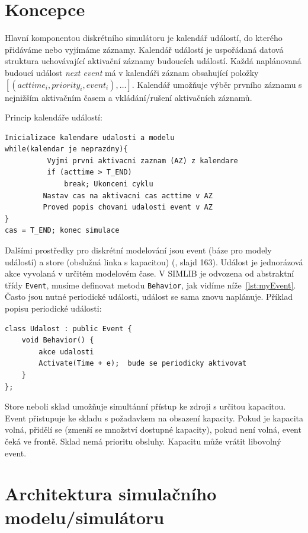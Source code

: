 \documentclass[12pt,a4paper,titlepage,final]{article}
\begin{document}
\section{Koncepce}

Hlavní komponentou diskrétního simulátoru je kalendář událostí, do kterého přidáváme nebo vyjímáme záznamy. 
Kalendář událostí je uspořádaná datová struktura uchovávající aktivační záznamy budoucích událostí. Každá naplánovaná budoucí událost \emph{next event} má v kalendáři záznam obsahující položky $[(acttime_{i}, priority_{i}, event_{i}), \dots]$. Kalendář umožňuje výběr prvního záznamu s nejnižším aktivačním časem a vkládání/rušení aktivačních záznamů.

Princip kalendáře událostí:
\begin{lstlisting}[label={lst:myListing}]
Inicializace kalendare udalosti a modelu
while(kalendar je neprazdny){
          Vyjmi prvni aktivacni zaznam (AZ) z kalendare
          if (acttime > T_END)
              break; Ukonceni cyklu
         Nastav cas na aktivacni cas acttime v AZ
         Proved popis chovani udalosti event v AZ
}
cas = T_END; konec simulace
\end{lstlisting}

Dalšími prostředky pro diskrétní modelování jsou event (báze pro modely událostí) a store (obslužná linka s kapacitou) (\cite{peringer}, slajd 163). Událost je jednorázová akce vyvolaná v určitém modelovém čase. V SIMLIB je odvozena od abstraktní třídy \texttt{Event}, musíme definovat metodu \texttt{Behavior}, jak vidíme níže~\ref{lst:myEvent}. Často jsou nutné periodické události, událost se sama znovu naplánuje. Příklad popisu periodické události:

\begin{lstlisting}[label={lst:myEvent}]
class Udalost : public Event {
    void Behavior() {
        akce udalosti
        Activate(Time + e);  bude se periodicky aktivovat
    }
};
\end{lstlisting}

Store neboli sklad umožňuje simultánní přístup ke zdroji s určitou kapacitou. Event přistupuje ke skladu s požadavkem na obsazení kapacity. Pokud je kapacita volná, přidělí se (zmenší se množství dostupné kapacity), pokud není volná, event čeká ve frontě. Sklad nemá prioritu obsluhy. Kapacitu může vrátit libovolný event. 

\section{Architektura simulačního modelu/simulátoru}
\end{document}
